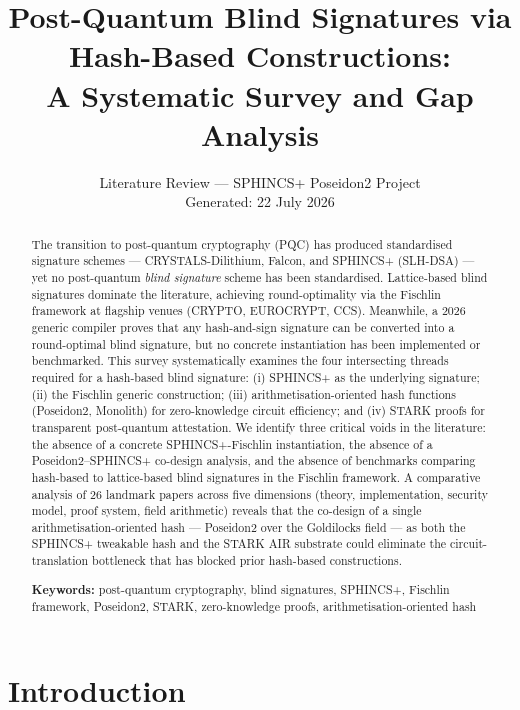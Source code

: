\documentclass[11pt,a4paper]{article}
\title{\textbf{Post-Quantum Blind Signatures via Hash-Based Constructions:\\
A Systematic Survey and Gap Analysis}}
\author{%
  \textsf{Literature Review --- SPHINCS+ Poseidon2 Project}\\
  \textsf{Generated: 22 July 2026}
}
\date{}
\begin{document}
\maketitle

\begin{abstract}
The transition to post-quantum cryptography (PQC) has produced standardised signature schemes
--- CRYSTALS-Dilithium, Falcon, and SPHINCS+ (SLH-DSA) --- yet no post-quantum \emph{blind
signature} scheme has been standardised.  Lattice-based blind signatures dominate the literature,
achieving round-optimality via the Fischlin framework at flagship venues (CRYPTO, EUROCRYPT,
CCS).  Meanwhile, a 2026 generic compiler proves that any hash-and-sign signature can be converted
into a round-optimal blind signature, but no concrete instantiation has been implemented or
benchmarked.  This survey systematically examines the four intersecting threads required for a
hash-based blind signature: (i) SPHINCS+ as the underlying signature; (ii) the Fischlin generic
construction; (iii) arithmetisation-oriented hash functions (Poseidon2, Monolith) for
zero-knowledge circuit efficiency; and (iv) STARK proofs for transparent post-quantum
attestation.  We identify three critical voids in the literature: the absence of a concrete
SPHINCS+-Fischlin instantiation, the absence of a Poseidon2--SPHINCS+ co-design analysis,
and the absence of benchmarks comparing hash-based to lattice-based blind signatures in the
Fischlin framework.  A comparative analysis of 26 landmark papers across five dimensions
(theory, implementation, security model, proof system, field arithmetic) reveals that the
co-design of a single arithmetisation-oriented hash --- Poseidon2 over the Goldilocks field ---
as both the SPHINCS+ tweakable hash and the STARK AIR substrate could eliminate the
circuit-translation bottleneck that has blocked prior hash-based constructions.

\medskip
\noindent\textbf{Keywords:}
post-quantum cryptography, blind signatures, SPHINCS+, Fischlin framework,
Poseidon2, STARK, zero-knowledge proofs, arithmetisation-oriented hash
\end{abstract}

\section{Introduction}
\label{sec:intro}
\end{document}

